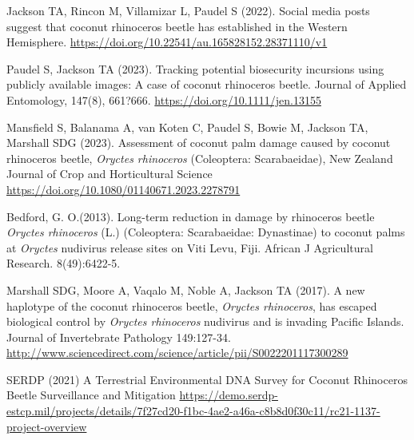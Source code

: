 \documentclass[11pt,english,letterpaper]{scrartcl}
\begin{document}
\begingroup
\renewcommand{\section}[2]{}%
\begin{thebibliography}{1}
	
 Jackson TA, Rincon M, Villamizar L, Paudel S (2022). Social media posts suggest that coconut rhinoceros beetle has established in the Western Hemisphere. \url{https://doi.org/10.22541/au.165828152.28371110/v1}
	
 Paudel S, Jackson TA (2023). Tracking potential biosecurity incursions using publicly available images: A case of coconut rhinoceros beetle. Journal of Applied Entomology, 147(8), 661?666. 
\url{https://doi.org/10.1111/jen.13155}
	
 Mansfield S, Balanama A, van Koten C, Paudel S, Bowie M, Jackson TA, Marshall SDG (2023). Assessment of coconut palm damage caused by coconut rhinoceros beetle, \textit{Oryctes rhinoceros} (Coleoptera: Scarabaeidae), New Zealand Journal of Crop and Horticultural Science \url{https://doi.org/10.1080/01140671.2023.2278791}
	

 Bedford, G. O.(2013). Long-term reduction in damage by rhinoceros beetle \textit{Oryctes rhinoceros} (L.) (Coleoptera: Scarabaeidae: Dynastinae) to coconut palms at \textit{Oryctes} nudivirus release sites on Viti Levu, Fiji. African J Agricultural Research. 8(49):6422-5. 

 Marshall SDG, Moore A, Vaqalo M, Noble A, Jackson TA (2017). A new haplotype of the coconut rhinoceros beetle, \textit{Oryctes rhinoceros}, has escaped biological control by \textit{Oryctes rhinoceros} nudivirus and is invading Pacific Islands. Journal of Invertebrate Pathology 149:127-34. 
\url{ http://www.sciencedirect.com/science/article/pii/S0022201117300289}

 SERDP (2021) A Terrestrial Environmental DNA Survey for Coconut Rhinoceros Beetle Surveillance and Mitigation
\url{https://demo.serdp-estcp.mil/projects/details/7f27cd20-f1bc-4ae2-a46a-c8b8d0f30c11/rc21-1137-project-overview}
	


\end{thebibliography}
\end{document}
